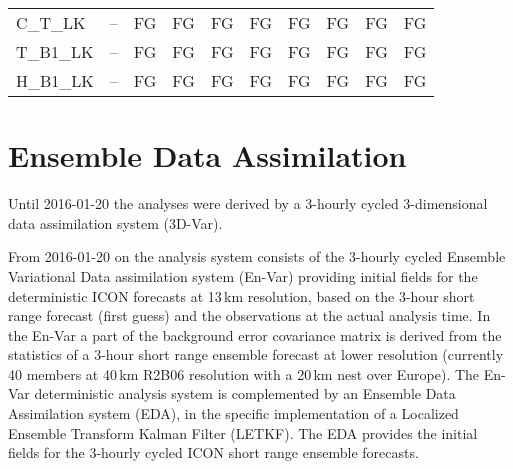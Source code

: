 \begin{longtable}{p{3.3cm}>{\centering\arraybackslash}p{2.5cm}p{0.7cm}p{0.7cm}p{0.7cm}p{0.7cm}p{0.7cm}p{0.7cm}p{0.7cm}p{0.7cm}}
C\_T\_LK            &      --             &   FG         &     FG      &     FG      &     FG      &     FG      &     FG      &     FG      &    FG         \\
T\_B1\_LK           &      --             &   FG         &     FG      &     FG      &     FG      &     FG      &     FG      &     FG      &    FG         \\
H\_B1\_LK           &      --             &   FG         &     FG      &     FG      &     FG      &     FG      &     FG      &     FG      &    FG         \\
  \bottomrule
\end{longtable}



\section{Ensemble Data Assimilation}\label{sec:EDA}

Until 2016-01-20 the analyses were derived by a 3-hourly cycled 3-dimensional
data assimilation system (3D-Var).

From 2016-01-20 on the analysis system consists of the 3-hourly cycled
Ensemble Variational Data assimilation system (En-Var) providing
initial fields for the deterministic ICON forecasts at 13\,km
resolution, based on the 3-hour short range forecast (first guess) and
the observations at the actual analysis time. In the En-Var a part of
the background error covariance matrix is derived from the statistics
of a 3-hour short range ensemble forecast at lower resolution
(currently 40 members at 40\,km R2B06 resolution with a 20\,km nest
over Europe). The En-Var deterministic analysis system is complemented
by an Ensemble Data Assimilation system (EDA), in the specific
implementation of a Localized Ensemble Transform Kalman Filter
(LETKF). The EDA provides the initial fields for the 3-hourly cycled
ICON short range ensemble forecasts.

